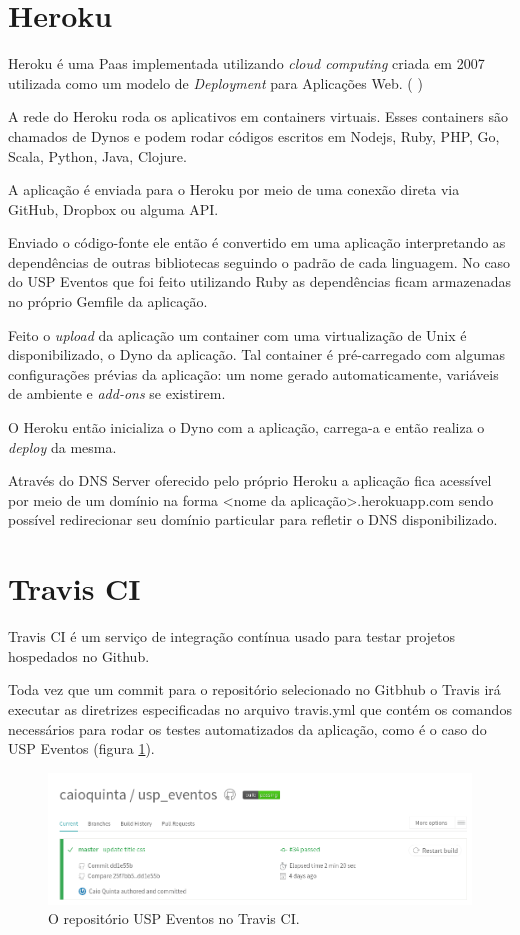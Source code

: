 \section{Heroku}
\par Heroku é uma Paas implementada utilizando \emph{cloud computing} criada em 2007 utilizada como um modelo de \emph{Deployment} para Aplicações Web. ( \cite{herokuwiki})
\par A rede do Heroku roda os aplicativos em containers virtuais. Esses containers são chamados de Dynos e podem rodar códigos escritos em Nodejs, Ruby, PHP, Go, Scala, Python, Java, Clojure.
\par A aplicação é enviada para o Heroku por meio de uma conexão direta via GitHub, Dropbox ou alguma API.
\par Enviado o código-fonte ele então é convertido em uma aplicação interpretando as dependências de outras bibliotecas seguindo o padrão de cada linguagem. No caso do USP Eventos que foi feito utilizando Ruby as dependências ficam armazenadas no próprio Gemfile da aplicação.
\par Feito o \emph{upload} da aplicação um container com uma virtualização de Unix é disponibilizado, o Dyno da aplicação. Tal container é pré-carregado com algumas configurações prévias da aplicação: um nome gerado automaticamente, variáveis de ambiente e \emph{add-ons} se existirem.
\par O Heroku então inicializa o Dyno com a aplicação, carrega-a e então realiza o \emph{deploy} da mesma.
\par Através do DNS Server oferecido pelo próprio Heroku a aplicação fica acessível por meio de um domínio na forma <nome da aplicação>.herokuapp.com sendo possível redirecionar seu domínio particular para refletir o DNS disponibilizado.
\section{Travis CI}
\par Travis CI é um serviço de integração contínua usado para testar projetos hospedados no Github.
\par Toda vez que um commit para o repositório selecionado no Gitbhub o Travis irá executar as diretrizes especificadas no arquivo travis.yml que contém os comandos necessários para rodar os testes automatizados da aplicação, como é o caso do USP Eventos (figura \ref{fig:travis}).
\begin{figure}[htb]
\centering
\includegraphics[width=15cm]{figuras/travis}
\caption{\label{fig:travis} O repositório USP Eventos no Travis CI.}
\end{figure}

